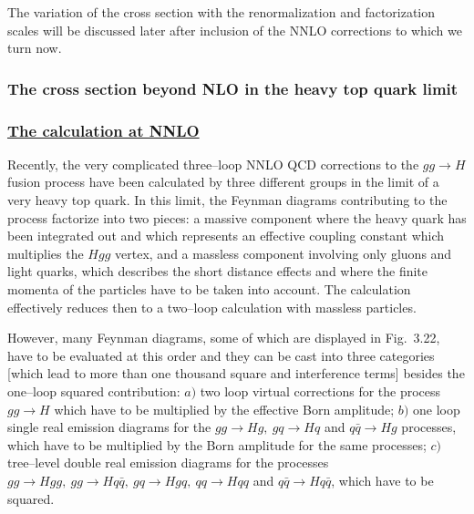 The variation of the cross section with the renormalization and factorization
scales will be discussed later after inclusion of the NNLO corrections to which
we turn now. 

\vspace*{-3mm} 
\subsubsection{The cross section beyond NLO in the heavy top quark limit}

\subsubsection*{\underline{The calculation at NNLO}}

Recently, the very complicated three--loop NNLO QCD corrections to the $gg \to
H$ fusion process have been calculated  by three different groups
\cite{ggH-NNLO1,ggH-NNLO2,ggH-NNLO3} in the limit of a very heavy top quark. In
this limit, the Feynman diagrams contributing to the process factorize into two
pieces: a massive component where the heavy quark has been integrated out and
which represents an effective coupling  constant which multiplies the $Hgg$
vertex, and a massless component involving only gluons and light quarks, which
describes the short distance effects  and where the finite momenta of the
particles have to be taken into account.  The calculation effectively  reduces
then to a two--loop calculation with massless particles. \s

However, many Feynman diagrams, some of which are displayed in Fig.~3.22, have 
to be evaluated at this order and they can be cast into three categories 
[which lead to more than one thousand square and interference terms] besides
the one--loop squared contribution:  
$a)$ two loop virtual corrections for the process $gg \to H$ which have 
to be multiplied by the effective Born amplitude; 
%
$b)$ one loop single real emission diagrams for the $gg \to Hg,\ gq \to 
Hq$ and $q\bar q \to Hg$ processes, which have to be multiplied by the Born 
amplitude for the same processes; 
%
$c)$ tree--level double real emission diagrams for the processes $gg 
\to Hgg, \ gg \to Hq\bar q, \ gq \to Hgq, \ qq \to Hqq$ and $q\bar q \to H 
q\bar q$, which have to be squared.


